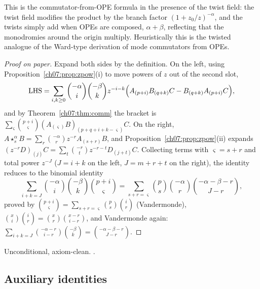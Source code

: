 \begin{physics}
This is the commutator-from-OPE formula in the presence of the twist field: the twist field modifies the product by the branch factor $(1+z_0/z)^{-\alpha}$, and the twists simply add when OPEs are composed, $\alpha+\beta$, reflecting that the monodromies around the origin multiply. Heuristically this is the twisted analogue of the Ward-type derivation of mode commutators from OPEs.
\end{physics}

\begin{proof}[Proof on paper]
Expand both sides by the definition. On the left, using Proposition~\ref{ch07:prop:zpow}(i) to
move powers of $z$ out of the second slot,
\begin{equation*}
  \text{LHS} = \sum_{i,k\ge0}\binom{-\alpha}i\binom{-\beta}kz^{-i-k}\Bigl(A_{(p+i)}B_{(q+k)}C -
  B_{(q+k)}A_{(p+i)}C\Bigr),
\end{equation*}
and by Theorem~\ref{ch07:thm:comm} the bracket is $\sum_\varsigma\binom{p+i}\varsigma
(A_{(\varsigma)}B)_{(p+q+i+k-\varsigma)}C$. On the right, $A\star^\alpha_sB = \sum_r
\binom{-\alpha}rz^{-r}A_{(s+r)}B$, and Proposition~\ref{ch07:prop:zpow}(ii) expands
$(z^{-r}D)_{(j)}C = \sum_t\binom{-r}tz^{-r-t}D_{(j+t)}C$. Collecting terms with $\varsigma = s+r$
and total power $z^{-J}$ ($J = i+k$ on the left, $J = m+r+t$ on the right), the identity reduces
to the binomial identity
\begin{equation*}
  \sum_{i+k=J}\binom{-\alpha}i\binom{-\beta}k\binom{p+i}\varsigma
  = \sum_{s+r=\varsigma}\binom ps\binom{-\alpha}r\binom{-\alpha-\beta-r}{J-r},
\end{equation*}
proved by $\binom{p+i}{\varsigma} = \sum_{s+r=\varsigma}\binom ps\binom ir$ (Vandermonde),
$\binom xi\binom ir = \binom xr\binom{x-r}{i-r}$, and Vandermonde again:
$\sum_{i+k=J}\binom{-\alpha-r}{i-r}\binom{-\beta}{k} = \binom{-\alpha-\beta-r}{J-r}$.
\end{proof}

\begin{status}
Unconditional, axiom-clean. .
\end{status}

\subsection{Auxiliary identities}

